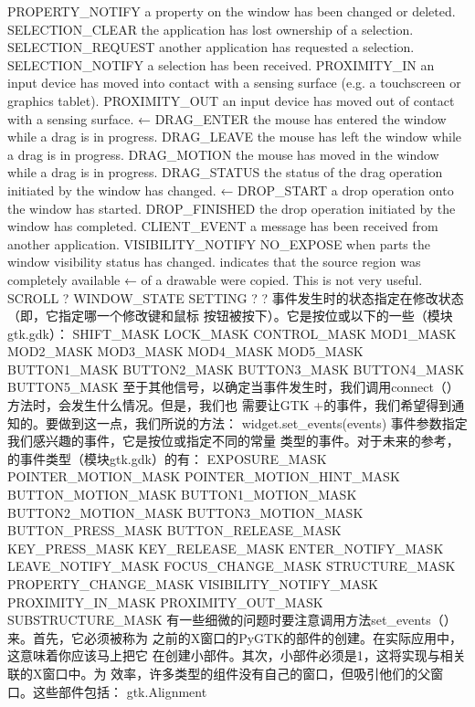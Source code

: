 PROPERTY_NOTIFY a property on the window has been changed or deleted.
SELECTION_CLEAR the application has lost ownership of a selection.
SELECTION_REQUEST another application has requested a selection.
SELECTION_NOTIFY a selection has been received.
PROXIMITY_IN an input device has moved into contact with a sensing surface
            (e.g. a touchscreen or graphics tablet).
	    PROXIMITY_OUT an input device has moved out of contact with a sensing
	    surface. ←
	    DRAG_ENTER the mouse has entered the window while a drag is in progress.
	    DRAG_LEAVE the mouse has left the window while a drag is in progress.
	    DRAG_MOTION the mouse has moved in the window while a drag is in progress.
	    DRAG_STATUS the status of the drag operation initiated by the window has
	    changed. ←
	    DROP_START a drop operation onto the window has started.
	    DROP_FINISHED the drop operation initiated by the window has completed.
	    CLIENT_EVENT a message has been received from another application.
	    VISIBILITY_NOTIFY
	    NO_EXPOSE
	    when parts
	    the window visibility status has changed.
	    indicates that the source region was completely available
	    ←
	    of a drawable were copied. This is not very useful.
	    SCROLL
	    ?
	    WINDOW_STATE
	    SETTING
	    ?
	    ?
	    事件发生时的状态指定在修改状态（即，它指定哪一个修改键和鼠标
	    按钮被按下）。它是按位或以下的一些（模块gtk.gdk）：
	    SHIFT_MASK
	    LOCK_MASK
	    CONTROL_MASK
	    MOD1_MASK
	    MOD2_MASK
	    MOD3_MASK
	    MOD4_MASK
	    MOD5_MASK
	    BUTTON1_MASK
	    BUTTON2_MASK
	    BUTTON3_MASK
	    BUTTON4_MASK
	    BUTTON5_MASK
	    至于其他信号，以确定当事件发生时，我们调用connect（）方法时，会发生什么情况。但是，我们也
	    需要让GTK +的事件，我们希望得到通知的。要做到这一点，我们所说的方法：	
widget.set_events(events)
事件参数指定我们感兴趣的事件，它是按位或指定不同的常量
类型的事件。对于未来的参考，的事件类型（模块gtk.gdk）的有：
EXPOSURE_MASK
POINTER_MOTION_MASK
POINTER_MOTION_HINT_MASK
BUTTON_MOTION_MASK
BUTTON1_MOTION_MASK
BUTTON2_MOTION_MASK
BUTTON3_MOTION_MASK
BUTTON_PRESS_MASK
BUTTON_RELEASE_MASK
KEY_PRESS_MASK
KEY_RELEASE_MASK
ENTER_NOTIFY_MASK
LEAVE_NOTIFY_MASK
FOCUS_CHANGE_MASK
STRUCTURE_MASK
PROPERTY_CHANGE_MASK
VISIBILITY_NOTIFY_MASK
PROXIMITY_IN_MASK
PROXIMITY_OUT_MASK
SUBSTRUCTURE_MASK
有一些细微的问题时要注意调用方法set_events（）来。首先，它必须被称为
之前的X窗口的PyGTK的部件的创建。在实际应用中，这意味着你应该马上把它
在创建小部件。其次，小部件必须是1，这将实现与相关联的X窗口中。为
效率，许多类型的组件没有自己的窗口，但吸引他们的父窗口。这些部件包括：
gtk.Alignment
